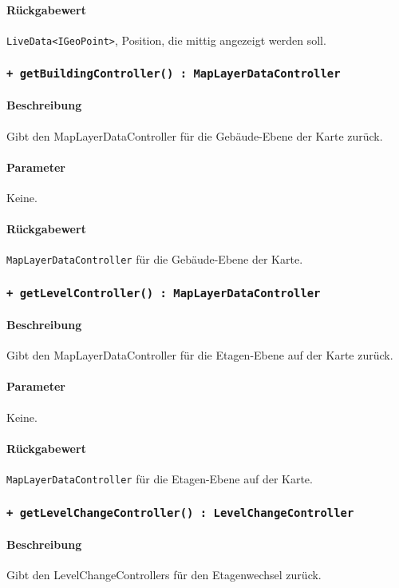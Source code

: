 \paragraph*{Rückgabewert}
\texttt{LiveData<IGeoPoint>}, Position, die mittig angezeigt werden soll.

\subsubsection*{\texttt{+ getBuildingController() : MapLayerDataController}}%
\paragraph*{Beschreibung}
Gibt den MapLayerDataController für die Gebäude-Ebene der Karte zurück.
\paragraph*{Parameter}
Keine.
\paragraph*{Rückgabewert}
\texttt{MapLayerDataController} für die Gebäude-Ebene der Karte.

\subsubsection*{\texttt{+ getLevelController() : MapLayerDataController}}%
\paragraph*{Beschreibung}
Gibt den MapLayerDataController für die Etagen-Ebene auf der Karte zurück.
\paragraph*{Parameter}
Keine.
\paragraph*{Rückgabewert}
\texttt{MapLayerDataController} für die Etagen-Ebene auf der Karte.

\subsubsection*{\texttt{+ getLevelChangeController() : LevelChangeController}}%
\paragraph*{Beschreibung}
Gibt den LevelChangeControllers für den Etagenwechsel zurück.
